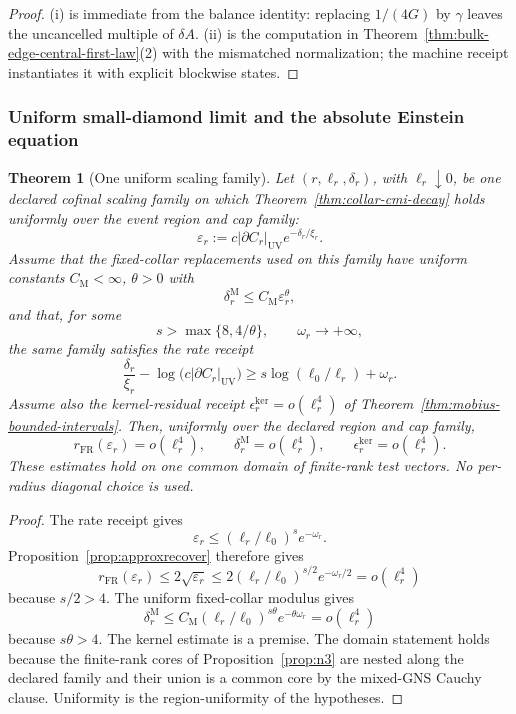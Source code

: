 \documentclass[11pt]{article}
\newtheorem{theorem}{Theorem}[section]
\begin{document}
\begin{proof}
(i) is immediate from the balance identity: replacing \(1/(4G)\) by
\(\gamma\) leaves the uncancelled multiple of \(\delta A\). (ii) is the
computation in Theorem~\ref{thm:bulk-edge-central-first-law}(2) with the
mismatched normalization; the machine receipt instantiates it with explicit
blockwise states.
\end{proof}

\subsubsection{Uniform small-diamond limit and the absolute Einstein equation}
\label{subsubsec:uniform-small-diamond-absolute}

\begin{theorem}[One uniform scaling family]
\label{thm:uniform-scaling-family}
Let \((r,\ell_r,\delta_r)\), with \(\ell_r\downarrow0\), be one declared
cofinal scaling family on which Theorem~\ref{thm:collar-cmi-decay} holds
uniformly over the event region and cap family:
\[
\varepsilon_r
:=
c|\partial C_r|_{\mathrm{UV}}e^{-\delta_r/\xi_r}.
\]
Assume that the fixed-collar replacements used on this family have uniform
constants \(C_{\mathrm M}<\infty\), \(\theta>0\) with
\[
\delta_r^{\mathrm M}\le C_{\mathrm M}\varepsilon_r^\theta,
\]
and that, for some
\[
s>\max\{8,4/\theta\},\qquad \omega_r\longrightarrow+\infty,
\]
the same family satisfies the rate receipt
\[
\frac{\delta_r}{\xi_r}
-\log\!\bigl(c|\partial C_r|_{\mathrm{UV}}\bigr)
\ge
s\log(\ell_0/\ell_r)+\omega_r.
\]
Assume also the kernel-residual receipt
\(\epsilon_r^{\mathrm{ker}}=o(\ell_r^4)\) of
Theorem~\ref{thm:mobius-bounded-intervals}. Then, uniformly over the declared
region and cap family,
\[
r_{\mathrm{FR}}(\varepsilon_r)=o(\ell_r^4),
\qquad
\delta_r^{\mathrm M}=o(\ell_r^4),
\qquad
\epsilon_r^{\mathrm{ker}}=o(\ell_r^4).
\]
These estimates hold on one common domain of finite-rank test vectors.
No per-radius diagonal choice is used.
\end{theorem}

\begin{proof}
The rate receipt gives
\[
\varepsilon_r
\le
(\ell_r/\ell_0)^s e^{-\omega_r}.
\]
Proposition~\ref{prop:approxrecover} therefore gives
\[
r_{\mathrm{FR}}(\varepsilon_r)
\le2\sqrt{\varepsilon_r}
\le2(\ell_r/\ell_0)^{s/2}e^{-\omega_r/2}
=o(\ell_r^4)
\]
because \(s/2>4\). The uniform fixed-collar modulus gives
\[
\delta_r^{\mathrm M}
\le C_{\mathrm M}(\ell_r/\ell_0)^{s\theta}
e^{-\theta\omega_r}
=o(\ell_r^4)
\]
because \(s\theta>4\). The kernel estimate is a premise. The domain statement
holds because the finite-rank cores of
Proposition~\ref{prop:n3} are nested along the declared family and their
union is a common core by the mixed-GNS Cauchy clause. Uniformity is the
region-uniformity of the hypotheses.
\end{proof}
\end{document}
